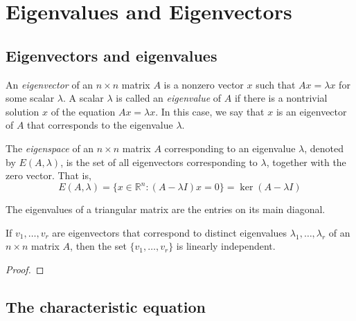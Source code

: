 \documentclass{article}
\begin{document}
\section{Eigenvalues and Eigenvectors}

\subsection{Eigenvectors and eigenvalues}

\begin{defn}
    An \emph{eigenvector} of an \(n\times n\) matrix \(A\) is a nonzero vector \(x\) such that \(Ax=\lambda x\) for some scalar \(\lambda\). A scalar \(\lambda\) is called an \emph{eigenvalue} of \(A\) if there is a nontrivial solution \(x\) of the equation \(Ax=\lambda x\). In this case, we say that \(x\) is an eigenvector of \(A\) that corresponds to the eigenvalue \(\lambda\).
\end{defn}

\begin{defn}
    The \emph{eigenspace} of an \(n\times n\) matrix \(A\) corresponding to an eigenvalue \(\lambda\), denoted by \(E(A, \lambda)\), is the set of all eigenvectors corresponding to \(\lambda\), together with the zero vector. That is, \[E(A, \lambda) = \{x \in \mathbb{R}^n : (A - \lambda I)x = 0\} = \ker (A - \lambda I)\]
\end{defn}

\begin{thm}
    The eigenvalues of a triangular matrix are the entries on its main diagonal.
\end{thm}

\begin{thm} 
    If \(v_1,\ldots,v_r\) are eigenvectors that correspond to distinct eigenvalues \(\lambda_1,\ldots,\lambda_r\) of an \(n\times n\) matrix \(A\), then the set \(\{v_1,\ldots,v_r\}\) is linearly independent.
\end{thm}

\begin{proof}
    
\end{proof}

\subsection{The characteristic equation}
\end{document}
